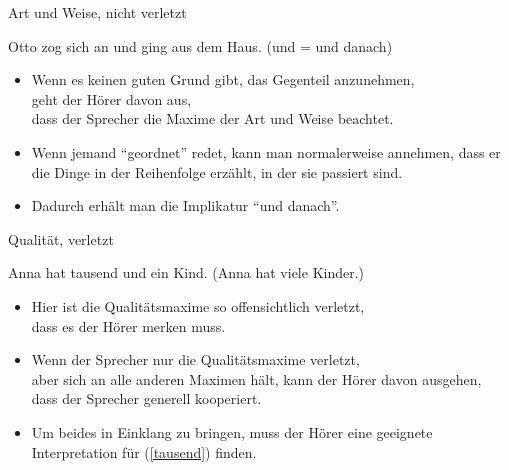  \begin{frame}{Art und Weise, nicht verletzt}

 \begin{exe}
   \ex Otto zog sich an und ging aus dem Haus. (\alert{und = und danach})
 \end{exe}


   \begin{itemize}
   \item  Wenn es keinen guten Grund gibt, das Gegenteil anzunehmen,\\ geht der Hörer davon aus,\\
          dass der Sprecher die Maxime der Art und Weise beachtet.\pause
   \item Wenn jemand "`geordnet"' redet, kann man normalerweise annehmen, dass er die Dinge in der Reihenfolge erzählt, in der sie passiert sind.\pause
   \item Dadurch erhält man die Implikatur "`und danach"'.
   \end{itemize}


\end{frame}



\begin{frame}{Qualität, verletzt}
  

\begin{exe}
  \ex Anna hat tausend und ein Kind. (\alert{Anna hat viele Kinder.})\label{tausend}
\end{exe}


\begin{itemize}
\item Hier ist die Qualitätsmaxime so offensichtlich verletzt,\\
      dass es der Hörer merken muss.\pause
\item Wenn der Sprecher nur die Qualitätsmaxime verletzt,\\
      aber sich an alle anderen Maximen hält, kann der Hörer davon ausgehen,\\ dass der Sprecher generell kooperiert.\pause
\item Um beides in Einklang zu bringen, muss der Hörer eine geeignete  Interpretation für (\ref{tausend}) finden.
\end{itemize}


\end{frame}



